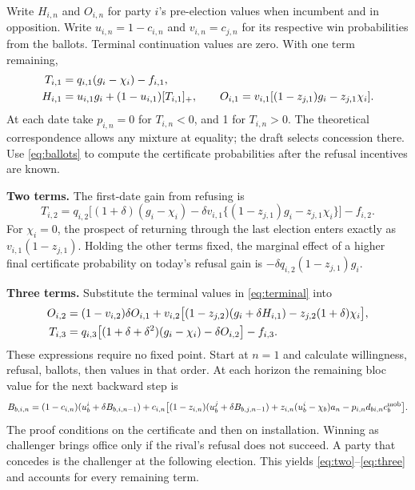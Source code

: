 \documentclass[11pt,letterpaper]{article}
\newcommand{\statement}[1]{\textbf{#1}\enspace}
\begin{document}
Write \(H_{i,n}\) and \(O_{i,n}\) for party \(i\)'s pre-election values when incumbent and in opposition. Write \(u_{i,n}=1-c_{i,n}\) and \(v_{i,n}=c_{j,n}\) for its respective win probabilities from the ballots. Terminal continuation values are zero. With one term remaining,
\begin{align}
 T_{i,1}&=q_{i,1}(g_i-\chi_i)-f_{i,1},\notag\\
 H_{i,1}&=u_{i,1}g_i+(1-u_{i,1})[T_{i,1}]_+,\qquad
 O_{i,1}=v_{i,1}[(1-z_{j,1})g_i-z_{j,1}\chi_i].\label{eq:terminal}
\end{align}
At each date take \(p_{i,n}=0\) for \(T_{i,n}<0\), and 1 for \(T_{i,n}>0\). The theoretical correspondence allows any mixture at equality; the draft selects concession there. Use \eqref{eq:ballots} to compute the certificate probabilities after the refusal incentives are known.

\statement{Two terms.} The first-date gain from refusing is
\begin{equation}
 T_{i,2}=q_{i,2}\Big[(1+\delta)(g_i-\chi_i)
       -\delta v_{i,1}\{(1-z_{j,1})g_i-z_{j,1}\chi_i\}\Big]-f_{i,2}.\label{eq:two}
\end{equation}
For \(\chi_i=0\), the prospect of returning through the last election enters exactly as \(v_{i,1}(1-z_{j,1})\). Holding the other terms fixed, the marginal effect of a higher final certificate probability on today's refusal gain is \(-\delta q_{i,2}(1-z_{j,1})g_i\).

\statement{Three terms.} Substitute the terminal values in \eqref{eq:terminal} into
\begin{align}
 O_{i,2}&=(1-v_{i,2})\delta O_{i,1}
 +v_{i,2}\big[(1-z_{j,2})(g_i+\delta H_{i,1})
                    -z_{j,2}(1+\delta)\chi_i\big],\notag\\
 T_{i,3}&=q_{i,3}\big[(1+\delta+\delta^2)(g_i-\chi_i)-\delta O_{i,2}\big]-f_{i,3}.\label{eq:three}
\end{align}
These expressions require no fixed point. Start at \(n=1\) and calculate willingness, refusal, ballots, then values in that order. At each horizon the remaining bloc value for the next backward step is
\[
 B_{b,i,n}=(1-c_{i,n})(u_b^i+\delta B_{b,i,n-1})+
 c_{i,n}\big[(1-z_{i,n})(u_b^j+\delta B_{b,j,n-1})+
 z_{i,n}(u_b^i-\chi_b)a_n-p_{i,n}d_{bi,n}c_b^{\rm mob}\big].
\]
The proof conditions on the certificate and then on installation. Winning as challenger brings office only if the rival's refusal does not succeed. A party that concedes is the challenger at the following election. This yields \eqref{eq:two}--\eqref{eq:three} and accounts for every remaining term.
\end{document}
